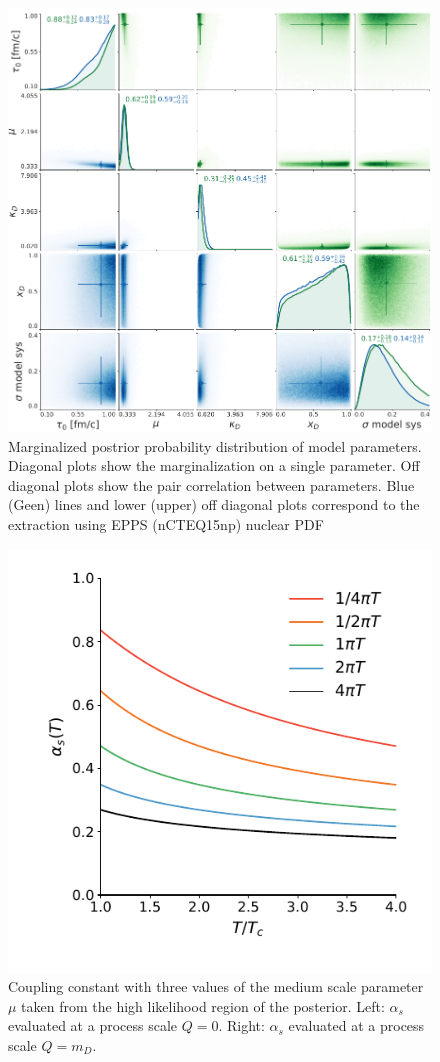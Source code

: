 \documentclass[aps, prc, reprint, amsmath, groupedaddress, nofootinbib]{revtex4-1}
\begin{document}
\begin{figure}
\includegraphics[width=.5\textwidth]{posterior.pdf}
\caption{Marginalized postrior probability distribution of model parameters. Diagonal plots show the marginalization on a single parameter. Off diagonal plots show the pair correlation between parameters. Blue (Geen) lines and lower (upper) off diagonal plots correspond to the extraction using EPPS (nCTEQ15np) nuclear PDF}\label{plots:posterior}
\end{figure}
\begin{figure}
\includegraphics[width=.5\textwidth]{alpha_s_at_T.pdf}
\caption{Coupling constant with three values of the medium scale parameter $\mu$ taken  from the high likelihood region of the posterior. Left: $\alpha_s$ evaluated at a process scale $Q=0$. Right: $\alpha_s$ evaluated at a process scale $Q=m_D$.}\label{plots:alphas}
\end{figure}
\end{document}
